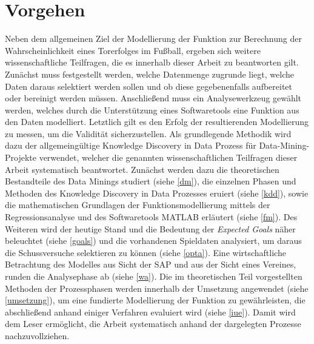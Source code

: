 \section{Vorgehen}

Neben dem allgemeinen Ziel der Modellierung der Funktion zur Berechnung der Wahrscheinlichkeit eines Torerfolges im Fußball, ergeben sich weitere wissenschaftliche Teilfragen, die es innerhalb dieser Arbeit zu beantworten gilt. Zunächst muss festgestellt werden, welche Datenmenge zugrunde liegt, welche Daten daraus selektiert werden sollen und ob diese gegebenenfalls aufbereitet oder bereinigt werden müssen. Anschließend muss ein Analysewerkzeug gewählt werden, welches durch die Unterstützung eines Softwaretools eine Funktion aus den Daten modelliert. Letztlich gilt es den Erfolg der resultierenden Modellierung zu messen, um die Validität sicherzustellen. Als grundlegende Methodik wird dazu der allgemeingültige Knowledge Discovery in Data Prozess für Data-Mining-Projekte verwendet, welcher die genannten wissenschaftlichen Teilfragen dieser Arbeit systematisch beantwortet. Zunächst werden dazu die theoretischen Bestandteile des Data Minings studiert (siehe \vref{dm}), die einzelnen Phasen und Methoden des Knowledge Discovery in Data Prozesses eruiert (siehe \vref{kdd}), sowie die mathematischen Grundlagen der Funktionsmodellierung mittels der Regressionsanalyse und des Softwaretools MATLAB erläutert (siehe \vref{fm}). Des Weiteren wird der heutige Stand und die Bedeutung der \textit{Expected Goals} näher beleuchtet (siehe \vref{goals}) und die vorhandenen Spieldaten analysiert, um daraus die Schussversuche selektieren zu können (siehe \vref{opta}). Eine wirtschaftliche Betrachtung des Modelles aus Sicht der SAP und aus der Sicht eines Vereines, runden die Analysephase ab (siehe \vref{wa}). Die im theoretischen Teil vorgestellten Methoden der Prozessphasen werden innerhalb der Umsetzung angewendet (siehe \vref{umsetzung}), um eine fundierte Modellierung der Funktion zu gewährleisten, die abschließend anhand einiger Verfahren evaluiert wird (siehe \vref{iue}). Damit wird dem Leser ermöglicht, die Arbeit systematisch anhand der dargelegten Prozesse nachzuvollziehen.

